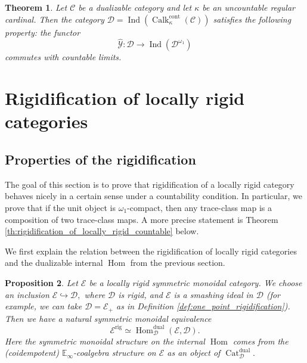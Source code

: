 \documentclass[11pt,leqno]{amsart}
\newtheorem{theo}{Theorem}[section]
\newtheorem{prop}[theo]{Proposition}
\numberwithin{equation}{section}
\def\Hom{\operatorname{Hom}}
\newcommand{\hto}{\hookrightarrow}
\newcommand{\rig}{\operatorname{rig}}
\newcommand{\Cat}{\operatorname{Cat}}
\newcommand{\cont}{\operatorname{cont}}
\newcommand{\dual}{\operatorname{dual}}
\newcommand{\bE}{{\mathbb E}}
\newcommand{\cD}{{\mathcal D}}
\newcommand{\cC}{{\mathcal C}}
\newcommand{\cE}{{\mathcal E}}
\newcommand{\cY}{{\mathcal Y}}
\newcommand{\Ind}{\operatorname{Ind}}
\newcommand{\Calk}{\operatorname{Calk}}
\begin{document}
\begin{theo}
Let $\cC$ be a dualizable category and let $\kappa$ be an uncountable regular cardinal. Then the category $\cD=\Ind(\Calk_{\kappa}^{\cont}(\cC))$ satisfies the following property: the functor $$\hat{\cY}:\cD\to\Ind(\cD^{\omega_1})$$ commutes with countable limits.
\end{theo}

\section{Rigidification of locally rigid categories}
\label{sec:rig_of_locally_rigid}

\subsection{Properties of the rigidification}

The goal of this section is to prove that rigidification of a locally rigid category behaves nicely in a certain sense under a countability condition. In particular, we prove that if the unit object is $\omega_1$-compact, then any trace-class map is a composition of two trace-class maps. A more precise statement is Theorem \ref{th:rigidification_of_locally_rigid_countable} below. 

We first explain the relation between the rigidification of locally rigid categories and the dualizable internal $\Hom$ from the previous section.

\begin{prop}\label{prop:rigidification_as_Hom^dual}
Let $\cE$ be a locally rigid symmetric monoidal category. We choose an inclusion $\cE\hto\cD,$ where $\cD$ is rigid, and $\cE$ is a smashing ideal in $\cD$ (for example, we can take $\cD=\cE_+$ as in Definition \ref{def:one_point_rigidification}). Then we have a natural symmetric monoidal equivalence
\begin{equation}
\cE^{\rig}\simeq \Hom_{\cD}^{\dual}(\cE,\cD).
\end{equation}
Here the symmetric monoidal structure on the internal $\Hom$ comes from the (coidempotent) $\bE_{\infty}$-coalgebra structure on $\cE$ as an object of $\Cat_{\cD}^{\dual}.$
\end{prop} 
\end{document}
